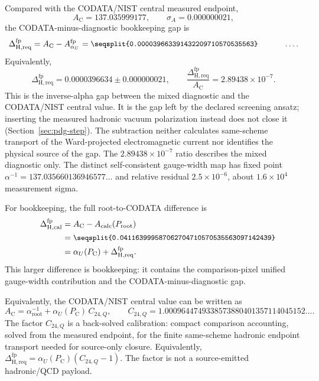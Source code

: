 \documentclass[11pt]{article}
\theoremstyle{remark}
\newcommand{\Ppub}{P_{\mathrm C}}
\newcommand{\Dcalib}{\Delta_{\mathrm{H,cal}}}
\newcommand{\Dhadreq}{\Delta_{\mathrm{H,req}}}
\newcommand{\decnum}[1]{\vcenter{\hbox{\parbox{0.68\linewidth}{\small\ttfamily\seqsplit{#1}}}}}
\begin{document}
Compared with the CODATA/NIST central measured endpoint,
\begin{equation}
A_{\mathrm C}=137.035999177,
\qquad
\sigma_A=0.000000021,
\end{equation}
the CODATA-minus-diagnostic bookkeeping gap is
\begin{equation}
\Dhadreq^{\mathrm{fp}}
=
A_{\mathrm C}-A_{\alpha_U}^{\mathrm{fp}}
=
\decnum{0.000039663391432209710570535563}\ldots.
\label{eq:Dempfp}
\end{equation}
Equivalently,
\begin{equation}
\Dhadreq^{\mathrm{fp}}
=0.0000396634\pm0.000000021,
\qquad
\frac{\Dhadreq^{\mathrm{fp}}}{A_{\mathrm C}}
=2.89438\times10^{-7}.
\label{eq:Dhadrequncertainty}
\end{equation}
This is the inverse-alpha gap between the mixed diagnostic and the CODATA/NIST central value. It is
the gap left by the declared screening ansatz; inserting the measured hadronic vacuum
polarization instead does not close it (Section~\ref{sec:pdg-step}). The subtraction neither
calculates same-scheme transport of the Ward-projected electromagnetic current nor
identifies the physical source of the gap.
The \(2.89438\times10^{-7}\) ratio describes the mixed diagnostic only. The distinct
self-consistent gauge-width map has fixed point
\(\alpha^{-1}=137.035660136946577\ldots\) and relative residual
\(2.5\times10^{-6}\), about \(1.6\times10^{4}\) measurement sigma.

For bookkeeping, the full root-to-CODATA difference is
\begin{align}
\Dcalib^{\mathrm{fp}}
&=
A_{\mathrm C}-A_{\mathrm{calc}}(P_{\mathrm{root}})
\nonumber\\
&=
\decnum{0.041163999587062704710570535563097142439}
\nonumber\\
&=
\alpha_U(\Ppub)+\Dhadreq^{\mathrm{fp}}.
\label{eq:rootcodatafp}
\end{align}
This larger difference is bookkeeping: it contains the comparison-pixel unified gauge-width
contribution and the CODATA-minus-diagnostic gap.

Equivalently, the CODATA/NIST central value can be written as
\begin{equation}
A_{\mathrm C}
=
\alpha_{\mathrm{root}}^{-1}+\alpha_U(\Ppub)\,C_{24,Q},
\qquad
C_{24,Q}=1.0009644749338573880401357114045152\ldots.
\label{eq:c24qfactor}
\end{equation}
The factor \(C_{24,Q}\) is a back-solved calibration: compact comparison
accounting, solved from the measured endpoint, for the finite same-scheme hadronic endpoint
transport needed for source-only closure. Equivalently,
\(\Dhadreq^{\mathrm{fp}}=\alpha_U(\Ppub)(C_{24,Q}-1)\). The factor is not a source-emitted
hadronic/QCD payload.
\end{document}
